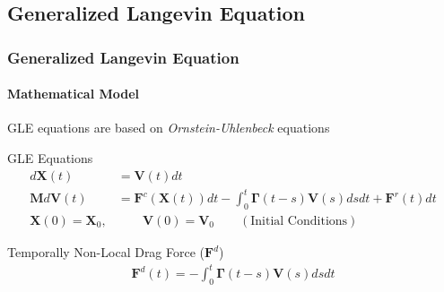 \documentclass[a4paper,10pt]{beamer}
\newcommand{\BS}[1]{\boldsymbol{#1}}
\begin{document}
	\begin{frame}
		\section{Generalized Langevin Equation}
		\frametitle{Generalized Langevin Equation}
		\framesubtitle{Mathematical Model}
		
		GLE equations are based on \textit{Ornstein-Uhlenbeck} equations
	
		\begin{block}{GLE Equations}
			\begin{align}
			d\BS{X}(t) &= \BS{V}(t) dt \\
			\BS{M} d\BS{V}(t) &= \BS{F}^{c}(\BS{X}(t)) dt - \int_{0}^{t} \BS{\Gamma}(t-s) \BS{V}(s) ds dt + \BS{F}^{r}(t)dt \\
			\BS{X}(0) = \BS{X}_{0}, &\qquad \BS{V}(0) = \BS{V}_{0} \qquad (\text{Initial Conditions})
			\end{align}
		\end{block}
	
		\begin{block}{Temporally Non-Local Drag Force ($\BS{F}^{d}$)}
			\begin{align}
			\BS{F}^{d} (t) = - \int_{0}^{t} \BS{\Gamma}(t-s) \BS{V}(s) ds dt
			\end{align}
		\end{block}
	\end{frame}
\end{document}
